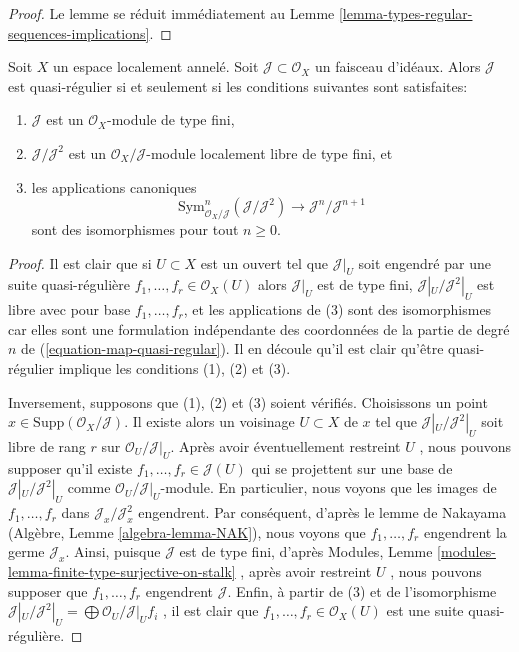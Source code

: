 \begin{proof}
Le lemme se réduit immédiatement au Lemme  \ref{lemma-types-regular-sequences-implications}.
\end{proof}

\begin{lemma}
\label{lemma-quasi-regular-ideal}
Soit  $X$  un espace localement annelé. Soit  $\mathcal{J} \subset \mathcal{O}_X$  un faisceau
d'idéaux. Alors  $\mathcal{J}$  est quasi-régulier si et seulement si les conditions
suivantes sont satisfaites:
\begin{enumerate}
\item $\mathcal{J}$  est un  $\mathcal{O}_X$-module de type fini,
\item $\mathcal{J}/\mathcal{J}^2$  est un  $\mathcal{O}_X/\mathcal{J}$-module localement libre de type fini, et
\item les applications canoniques
$$
\text{Sym}^n_{\mathcal{O}_X/\mathcal{J}}(\mathcal{J}/\mathcal{J}^2)
\longrightarrow
\mathcal{J}^n/\mathcal{J}^{n + 1}
$$
sont des isomorphismes pour tout  $n \geq 0$.
\end{enumerate}
\end{lemma}

\begin{proof}
Il est clair que si  $U \subset X$  est un ouvert tel que  $\mathcal{J}|_U$  soit engendré
par une suite quasi-régulière  $f_1, \ldots, f_r \in \mathcal{O}_X(U)$  alors  $\mathcal{J}|_U$  est de type fini,
 $\mathcal{J}|_U/\mathcal{J}^2|_U$  est libre avec pour base  $f_1, \ldots, f_r$, et les applications de (3)
sont des isomorphismes car elles sont une formulation indépendante des coordonnées
de la partie de degré  $n$  de (\ref{equation-map-quasi-regular}). Il en découle qu'il est
clair qu'être quasi-régulier implique les conditions (1), (2) et (3).

\medskip\noindent
Inversement, supposons que (1), (2) et (3) soient vérifiés. Choisissons un point
 $x \in \text{Supp}(\mathcal{O}_X/\mathcal{J})$. Il existe alors un voisinage  $U \subset X$  de  $x$  tel que
 $\mathcal{J}|_U/\mathcal{J}^2|_U$  soit libre de rang  $r$  sur  $\mathcal{O}_U/\mathcal{J}|_U$. Après avoir
éventuellement restreint  $U$ , nous pouvons supposer qu'il existe
 $f_1, \ldots, f_r \in \mathcal{J}(U)$  qui se projettent sur une base de  $\mathcal{J}|_U/\mathcal{J}^2|_U$  comme
 $\mathcal{O}_U/\mathcal{J}|_U$-module. En particulier, nous voyons que les images de  $f_1, \ldots, f_r$ 
dans  $\mathcal{J}_x/\mathcal{J}^2_x$  engendrent. Par conséquent, d'après le lemme de Nakayama
(Algèbre, Lemme  \ref{algebra-lemma-NAK}), nous voyons que  $f_1, \ldots, f_r$  engendrent la germe
 $\mathcal{J}_x$. Ainsi, puisque  $\mathcal{J}$  est de type fini, d'après Modules, Lemme
 \ref{modules-lemma-finite-type-surjective-on-stalk} , après avoir restreint  $U$ , nous pouvons supposer que
 $f_1, \ldots, f_r$  engendrent  $\mathcal{J}$. Enfin, à partir de (3) et de l'isomorphisme
 $\mathcal{J}|_U/\mathcal{J}^2|_U = \bigoplus \mathcal{O}_U/\mathcal{J}|_U f_i$ , il est clair que  $f_1, \ldots, f_r \in \mathcal{O}_X(U)$  est une suite quasi-régulière.
\end{proof}

